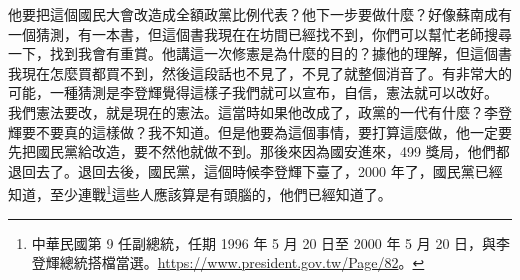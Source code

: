 \hypertarget{w05:cue:333}{}他要把這個國民大會改造成全額政黨比例代表？他下一步要做什麼？好像蘇南成有一個猜測，有一本書，但這個書我現在在坊間已經找不到，你們可以幫忙老師搜尋一下，找到我會有重賞。他講這一次修憲是為什麼的目的？據他的理解，但這個書我現在怎麼買都買不到，然後這段話也不見了，不見了就整個消音了。有非常大的可能，一種猜測是李登輝覺得這樣子我們就可以宣布，自信，憲法就可以改好。
\hypertarget{w05:cue:334}{}我們憲法要改，就是現在的憲法。這當時如果他改成了，政黨的一代有什麼？李登輝要不要真的這樣做？我不知道。但是他要為這個事情，要打算這麼做，他一定要先把國民黨給改造，要不然他就做不到。那後來因為國安進來，499 獎局，他們都退回去了。退回去後，國民黨，這個時候李登輝下臺了，2000 年了，國民黨已經知道，至少連戰\footnote{中華民國第 9 任副總統，任期 1996 年 5 月 20 日至 2000 年 5 月 20 日，與李登輝總統搭檔當選。\url{https://www.president.gov.tw/Page/82}。}這些人應該算是有頭腦的，他們已經知道了。


